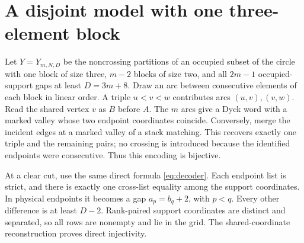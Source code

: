 \section{A disjoint model with one three-element block}\label{sec:partitions}
Let $Y=Y_{m,N,D}$ be the noncrossing partitions of an occupied subset of the circle with one block of size three, $m-2$ blocks of size two, and all $2m-1$ occupied-support gaps at least $D=3m+8$. Draw an arc between consecutive elements of each block in linear order. A triple $u<v<w$ contributes arcs $(u,v),(v,w)$. Read the shared vertex $v$ as $B$ before $A$. The $m$ arcs give a Dyck word with a marked valley whose two endpoint coordinates coincide. Conversely, merge the incident edges at a marked valley of a stack matching. This recovers exactly one triple and the remaining pairs; no crossing is introduced because the identified endpoints were consecutive. Thus this encoding is bijective.

At a clear cut, use the same direct formula \eqref{eq:decoder}. Each endpoint list is strict, and there is exactly one cross-list equality among the support coordinates. In physical endpoints it becomes a gap $a_p=b_q+2$, with $p<q$. Every other difference is at least $D-2$. Rank-paired support coordinates are distinct and separated, so all rows are nonempty and lie in the grid. The shared-coordinate reconstruction proves direct injectivity.

